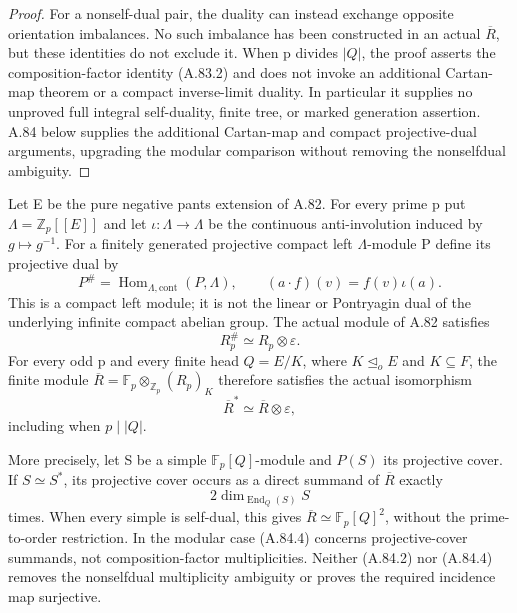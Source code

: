 \begin{proof}
For a nonself-dual pair, the duality can instead exchange
opposite orientation imbalances. No such imbalance has
been constructed in an actual \(\overline R\), but
these identities do not exclude it. When p divides
\(|Q|\), the proof asserts the composition-factor
identity (A.83.2) and does not invoke an additional
Cartan-map theorem or a compact inverse-limit duality.
In particular it supplies no unproved full integral
self-duality, finite tree, or marked generation assertion.
A.84 below supplies the additional Cartan-map and compact
projective-dual arguments, upgrading the modular comparison
without removing the nonselfdual ambiguity.
\end{proof}


Let E be the pure negative pants extension of A.82. For every prime p
put \(\Lambda=\mathbb Z_p[[E]]\) and let
\(\iota:\Lambda\longrightarrow\Lambda\) be the continuous
anti-involution induced by \(g\mapsto g^{-1}\). For a finitely generated
projective compact left \(\Lambda\)-module P define its projective dual by
\[
 P^\#=\operatorname{Hom}_{\Lambda,\mathrm{cont}}(P,\Lambda),
 \qquad (a\cdot f)(v)=f(v)\iota(a).
 \tag{A.84.1}
\]
This is a compact left module; it is not the linear or Pontryagin dual
of the underlying infinite compact abelian group. The actual module of
A.82 satisfies
\[
                         R_p^\#\simeq R_p\otimes\varepsilon.
 \tag{A.84.2}
\]
For every odd p and every finite head \(Q=E/K\), where
\(K\trianglelefteq_o E\) and \(K\subseteq F\), the finite module
\(\overline R=\mathbb F_p\otimes_{\mathbb Z_p}(R_p)_K\)
therefore satisfies the actual isomorphism
\[
                         \overline R^*\simeq
                                    \overline R\otimes\varepsilon,
 \tag{A.84.3}
\]
including when \(p\mid |Q|\).

More precisely, let S be a simple \(\mathbb F_p[Q]\)-module and
\(P(S)\) its projective cover. If \(S\simeq S^*\), its projective
cover occurs as a direct summand of \(\overline R\) exactly
\[
                          2\dim_{\operatorname{End}_Q(S)}S
 \tag{A.84.4}
\]
times. When every simple is self-dual, this gives
\(\overline R\simeq\mathbb F_p[Q]^2\), without the
prime-to-order restriction. In the modular case (A.84.4) concerns
projective-cover summands, not composition-factor multiplicities.
Neither (A.84.2) nor (A.84.4) removes the nonselfdual multiplicity
ambiguity or proves the required incidence map surjective.

